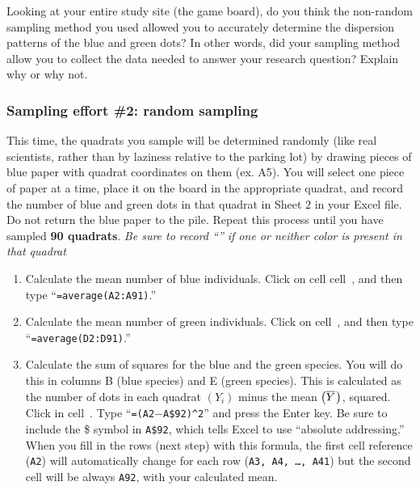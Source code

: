 \documentclass[12pt, hidelinks]{exam}
\newcommand*\meanY{\overline{Y}\kern0.67pt}
\newcommand*\xcell[1]{cell~\liningnum{#1}}
\begin{document}
\begin{questions}

\question
Looking at your entire study site (the game board), do you think 
the non-random sampling method you used allowed you to accurately 
determine the dispersion patterns of the
blue and green dots? In other words, did your sampling method allow you
to collect the data needed to answer your research question? Explain why
or why not.

\vspace{6\baselineskip}

\subsubsection*{Sampling effort \#2: random sampling}

This time, the quadrats you sample will be determined randomly (like real
scientists, rather
than by laziness relative to the parking lot) by drawing pieces of blue
paper with quadrat coordinates on them (ex. {\liningnum A5}). You will select one
piece of paper at a time, place it on the board in the appropriate
quadrat, and record the number of blue and green dots in that quadrat in
Sheet 2 in your Excel file. Do not return the blue paper to the pile.
Repeat this process until you have sampled \textbf{90 quadrats}.
\emph{Be sure to record “{}” if one or neither color is present in that
	quadrat}



\begin{enumerate}
\item Calculate the mean number of blue individuals. Click on cell \xcell{A42}, and then type
“\texttt{=average(A2:A91)}.”


\item Calculate the mean number of green individuals. Click on \xcell{D92}, and then type
“\texttt{=average(D2:D91)}.”


\item Calculate the sum of squares for the blue and the green species. You will do this in columns B (blue species) and E (green species). This is calculated as the number of dots in each quadrat $\left( Y_i \right)$ minus the mean $\left( \meanY \right)$,
squared. Click in \xcell{B2}. Type “\texttt{=(A2$-$A\$92)\textasciicircum2}” and press the Enter key. 
Be sure to include the \$ symbol in \texttt{A\$92}, which tells Excel to use “absolute addressing.” When you fill in the rows (next step) with this formula, the first cell reference (\texttt{A2}) will automatically change for each row (\texttt{A3,\,A4,\,\dots,\,A41}) but the second cell will be always \texttt{A92}, with your calculated mean. 


\end{enumerate}
\end{questions}
\end{document}
